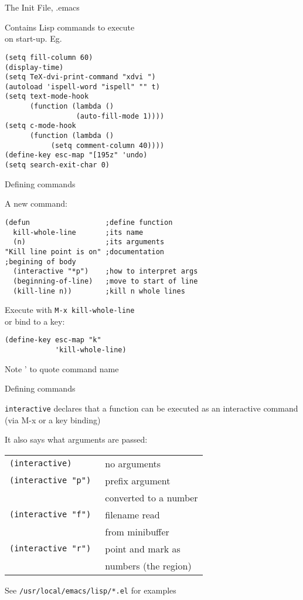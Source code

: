 \begin{slide}{}
The Init File, .emacs

Contains Lisp commands to execute \\
on start-up.  Eg.
\tt
\begin{verbatim}
(setq fill-column 60)
(display-time)
(setq TeX-dvi-print-command "xdvi ")
(autoload 'ispell-word "ispell" "" t)
(setq text-mode-hook
      (function (lambda ()
                 (auto-fill-mode 1))))
(setq c-mode-hook
      (function (lambda ()
           (setq comment-column 40))))
(define-key esc-map "[195z" 'undo)
(setq search-exit-char 0)
\end{verbatim}
\end{slide}

\begin{slide}{}
Defining commands

A new command:
\begin{verbatim}
(defun                  ;define function
  kill-whole-line       ;its name
  (n)                   ;its arguments
"Kill line point is on" ;documentation
;begining of body
  (interactive "*p")    ;how to interpret args
  (beginning-of-line)   ;move to start of line
  (kill-line n))        ;kill n whole lines
\end{verbatim}

Execute with {\tt M-x kill-whole-line} \\
or bind to a key:

{\tt\begin{verbatim}
(define-key esc-map "k"
            'kill-whole-line)
\end{verbatim}}

Note ' to quote command name
\end{slide}

\begin{slide}{}
Defining commands

{\tt interactive} declares that a function can be executed as
an interactive command (via M-x or a key binding)

It also says what arguments are passed:

\begin{tabular}{ll}
\tt (interactive) & no arguments \\
\tt (interactive "p") & prefix argument \\
                      & converted to a number \\
\tt (interactive "f") & filename read \\
                      & from minibuffer \\
\tt (interactive "r") & point and mark as \\
                      & numbers (the region)
\end{tabular}

See {\tt /usr/local/emacs/lisp/*.el} for examples
\end{slide}

